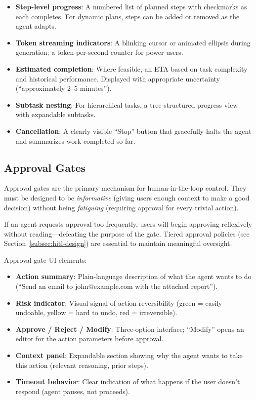 \begin{itemize}
  \item \textbf{Step-level progress}: A numbered list of planned steps with checkmarks as each completes. For dynamic plans, steps can be added or removed as the agent adapts.
  \item \textbf{Token streaming indicators}: A blinking cursor or animated ellipsis during generation; a token-per-second counter for power users.
  \item \textbf{Estimated completion}: Where feasible, an ETA based on task complexity and historical performance. Displayed with appropriate uncertainty (``approximately 2--5 minutes'').
  \item \textbf{Subtask nesting}: For hierarchical tasks, a tree-structured progress view with expandable subtasks.
  \item \textbf{Cancellation}: A clearly visible ``Stop'' button that gracefully halts the agent and summarizes work completed so far.
\end{itemize}

\subsection{Approval Gates}
\label{approval-gates}

Approval gates are the primary mechanism for human-in-the-loop control. They must be designed to be \emph{informative} (giving users enough context to make a good decision) without being \emph{fatiguing} (requiring approval for every trivial action).

\begin{warningbox}
If an agent requests approval too frequently, users will begin approving reflexively without reading---defeating the purpose of the gate. Tiered approval policies (see Section~\ref{subsec:hitl-design}) are essential to maintain meaningful oversight.
\end{warningbox}

Approval gate UI elements:

\begin{itemize}
  \item \textbf{Action summary}: Plain-language description of what the agent wants to do (``Send an email to john@example.com with the attached report'').
  \item \textbf{Risk indicator}: Visual signal of action reversibility (green = easily undoable, yellow = hard to undo, red = irreversible).
  \item \textbf{Approve / Reject / Modify}: Three-option interface; ``Modify'' opens an editor for the action parameters before approval.
  \item \textbf{Context panel}: Expandable section showing why the agent wants to take this action (relevant reasoning, prior steps).
  \item \textbf{Timeout behavior}: Clear indication of what happens if the user doesn’t respond (agent pauses, not proceeds).
\end{itemize}

